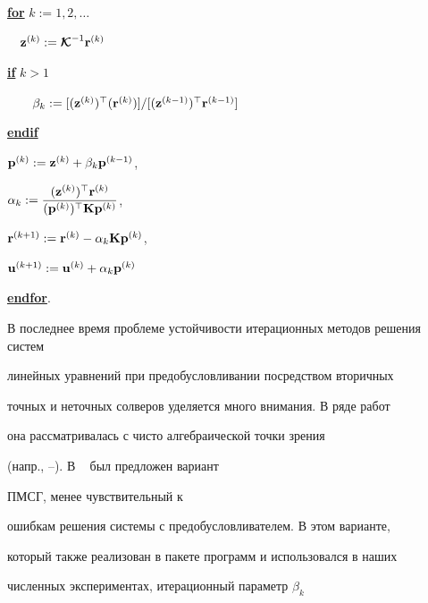 \underline{{\bf for}} $k:=1,2,\dotsc$





$\quad {\bold z}^{(k)}:=\boldsymbol {\cal K}^{-1} {\bold r}^{(k)}$





\quad \underline{{\bf if}} $k>1$





$\qquad \beta_k:= [({\bold z}^{(k)})^\top ( {\bold r}^{(k)})]/


[({\bold z}^{(k-1)})^\top{\bold r}^{(k-1)}]$





\quad \underline{{\bf endif}}





\quad ${\bold p}^{(k)} := {\bold z}^{(k)} + \beta_k {\bold p}^{(k-1)}$,


$\alpha_k :={\displaystyle


\frac{({\bold z}^{(k)})^\top {\bold r}^{(k)}}{({\bold p}^{(k)})^\top


{\bold K}{\bold p}^{(k)}}}$,


${\bold r}^{(k+1)} := {\bold r}^{(k)}-\alpha_k {\bold K}{\bold p}^{(k)}$,


${\bold u}^{(k+1)} := {\bold u}^{(k)}+\alpha_k {\bold p}^{(k)}$





\underline{{\bf endfor}}.





В последнее время проблеме устойчивости итерационных методов решения систем


линейных уравнений при предобусловливании посредством вторичных


точных и неточных солверов уделяется много внимания. В ряде работ


она рассматривалась с чисто алгебраической точки зрения


(напр., \cite{GGK}--\cite{GO}). В ~\cite{GE} был предложен вариант 


ПМСГ, менее чувствительный к


ошибкам решения системы с предобусловливателем. В этом варианте,


который также реализован в пакете программ и использовался в наших


численных экспериментах, итерационный параметр $\beta_k$


